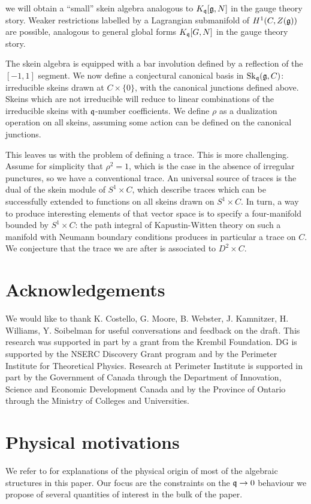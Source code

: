 \documentclass[12pt]{amsart}
\begin{document}
we will obtain a ``small'' skein algebra analogous to $K_{\mathfrak{q}}[\mathfrak{g},N]$ in the gauge theory story. Weaker restrictions labelled by a Lagrangian submanifold of $H^1(C,Z(\mathfrak{g}))$ are possible, analogous to general global forms $K_{\mathfrak{q}}[G,N]$ in the gauge theory story.

The skein algebra is equipped with a bar involution defined by a reflection of the $[-1,1]$ segment. We now define a conjectural canonical basis in 
$\mathrm{Sk}_{\mathfrak{q}}(\mathfrak{g},C)$: irreducible skeins drawn at $C \times \{0\}$, with the canonical junctions defined above. Skeins which are not irreducible 
will reduce to linear combinations of the irreducible skeins with $\mathfrak{q}$-number coefficients. We define $\rho$ as a dualization operation on all skeins,
assuming some action can be defined on the canonical junctions. 

This leaves us with the problem of defining a trace. This is more challenging. Assume for simplicity that $\rho^2=1$, which is the case in the absence of irregular punctures, so we have a conventional trace. An universal source of traces is the dual of the skein module of $S^1 \times C$, which describe traces which can be successfully extended to functions on all skeins drawn on 
$S^1 \times C$. In turn, a way to produce interesting elements of that vector space is to specify a four-manifold bounded by $S^1 \times C$: the path integral of Kapustin-Witten theory on such a manifold with Neumann boundary conditions produces in particular a trace on $C$. We conjecture that the trace we are after is associated to $D^2 \times C$. 

\section*{Acknowledgements}
We would like to thank K. Costello, G. Moore, B. Webster, J. Kamnitzer, H. Williams, Y. Soibelman for useful conversations and feedback on the draft.
This research was supported in part by a grant from the Krembil Foundation. DG is supported by
the NSERC Discovery Grant program and by the Perimeter Institute for Theoretical Physics.
Research at Perimeter Institute is supported in part by the Government of Canada through the Department of Innovation, Science and Economic
Development Canada and by the Province of Ontario through the Ministry of Colleges and Universities.

\appendix 


\section{Physical motivations}\label{app:physics}
We refer to \cite{Gaiotto:2010be, Kapustin:2007wm,Cordova:2016uwk,Ambrosino:2025qpy,Gaiotto:2024fso} for explanations of the physical origin of most of the algebraic structures in this paper. Our focus are the constraints on the $\mathfrak{q} \to 0$ behaviour we propose of several quantities of interest in the bulk of the paper. 
\end{document}
